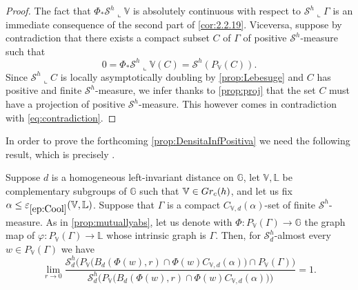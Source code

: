 \documentclass[10pt, a4paper,
oneside, headinclude,footinclude]{scrartcl}
\begin{document}
\begin{proof}

The fact that $\Phi_*\mathcal{S}^h\llcorner \mathbb{V}$ is absolutely continuous with respect to $\mathcal{S}^h\llcorner \Gamma$ is an immediate consequence of the second part of \cref{cor:2.2.19}. 
Viceversa, suppose by contradiction that there exists a compact subset $C$ of $\Gamma$ of positive $\mathcal{S}^h$-measure such that
\begin{equation}
    0=\Phi_*\mathcal{S}^h\llcorner \mathbb{V}(C)=\mathcal{S}^h(P_\mathbb{V}(C)).
    \label{eq:contradiction}
\end{equation}
Since $\mathcal{S}^h\llcorner C$ is locally asymptotically doubling by \cref{prop:Lebesuge} and $C$ has positive and finite $\mathcal{S}^h$-measure, we infer thanks to \cref{prop:proj} that the set $C$ must have a projection of positive $\mathcal{S}^h$-measure. This however comes in contradiction with \eqref{eq:contradiction}.
\end{proof}

In order to prove the forthcoming \cref{prop:DensitaInfPositiva} we need the following result, which is precisely \cite[Proposition 4.10]{antonelli2020rectifiable}.

\begin{proposizione}
\label{prop:vitali2PD}
Suppose $d$ is a homogeneous left-invariant distance on $\mathbb{G}$, let $\mathbb V,\mathbb L$ be complementary subgroups of $\mathbb G$ such that $\mathbb V\in Gr_c(h)$, and let us fix $\alpha\leq\oldep{ep:Cool}(\mathbb V,\mathbb L)$. Suppose that $\Gamma$ is a compact $C_{\mathbb V,d}(\alpha)$-set of finite $\mathcal{S}^h$-measure. As in \cref{prop:mutuallyabs}, let us denote with $\Phi:P_{\mathbb V}(\Gamma)\to\mathbb G$ the graph map of $\varphi:P_{\mathbb V}(\Gamma)\to \mathbb L$ whose intrinsic graph is $\Gamma$.
Then, for $\mathcal{S}^h_d$-almost every $w\in P_\mathbb{V}(\Gamma)$ we have
\begin{equation}
    \lim_{r\to 0}\frac{\mathcal{S}^h_d\big(P_\mathbb{V}\big(B_{d}(\Phi(w),r)\cap \Phi(w)C_{\mathbb V,d}(\alpha)\big)\cap P_\mathbb{V}(\Gamma)\big)}{\mathcal{S}_{d}^h\big(P_\mathbb{V}\big(B_d(\Phi(w),r)\cap \Phi(w)C_{\mathbb V,d}(\alpha)\big)\big)}=1.
    \label{eq:limi}
\end{equation}
\end{proposizione}
\end{document}
